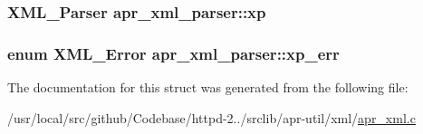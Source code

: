 \subsubsection[{\texorpdfstring{xp}{xp}}]{\setlength{\rightskip}{0pt plus 5cm}X\+M\+L\+\_\+\+Parser apr\+\_\+xml\+\_\+parser\+::xp}\hypertarget{structapr__xml__parser_a89f057a36ac193b51a002780f9845a45}{}\label{structapr__xml__parser_a89f057a36ac193b51a002780f9845a45}
\subsubsection[{\texorpdfstring{xp\+\_\+err}{xp_err}}]{\setlength{\rightskip}{0pt plus 5cm}enum X\+M\+L\+\_\+\+Error apr\+\_\+xml\+\_\+parser\+::xp\+\_\+err}\hypertarget{structapr__xml__parser_ad3de52fb8602ae90814374b14f1539e8}{}\label{structapr__xml__parser_ad3de52fb8602ae90814374b14f1539e8}


The documentation for this struct was generated from the following file\+:\begin{DoxyCompactItemize}
\item 
/usr/local/src/github/\+Codebase/httpd-\/2../srclib/apr-\/util/xml/\hyperlink{apr__xml_8c}{apr\+\_\+xml.\+c}\end{DoxyCompactItemize}
